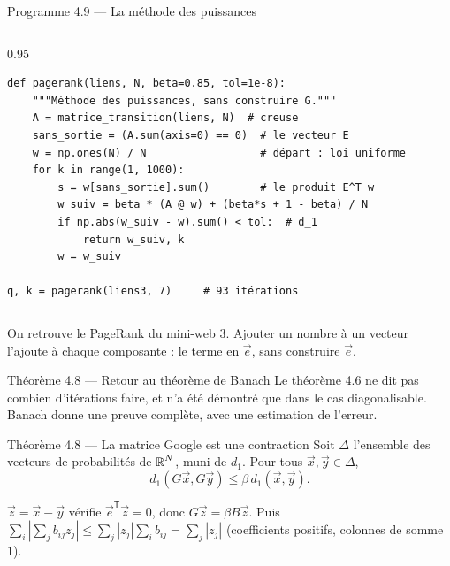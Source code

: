 \begin{frame}[fragile]{Programme 4.9 --- La méthode des puissances}
  \begin{columns}[T]
    \begin{column}{0.95\textwidth}
\begin{lstlisting}
def pagerank(liens, N, beta=0.85, tol=1e-8):
    """Méthode des puissances, sans construire G."""
    A = matrice_transition(liens, N)  # creuse
    sans_sortie = (A.sum(axis=0) == 0)  # le vecteur E
    w = np.ones(N) / N                  # départ : loi uniforme
    for k in range(1, 1000):
        s = w[sans_sortie].sum()        # le produit E^T w
        w_suiv = beta * (A @ w) + (beta*s + 1 - beta) / N
        if np.abs(w_suiv - w).sum() < tol:  # d_1
            return w_suiv, k
        w = w_suiv

q, k = pagerank(liens3, 7)     # 93 itérations
\end{lstlisting}
    \end{column}
  \end{columns}
  \small On retrouve le PageRank du mini-web 3. Ajouter un nombre à un
  vecteur l'ajoute à chaque composante : le terme en $\vec e$, sans
  construire $\vec e$.
\end{frame}

\begin{frame}{Théorème 4.8 --- Retour au théorème de Banach}
  \small Le théorème 4.6 ne dit pas combien d'itérations faire, et n'a été
  démontré que dans le cas diagonalisable. Banach donne une preuve
  complète, avec une estimation de l'erreur.
  \begin{Enonce}{Théorème 4.8 --- La matrice Google est une contraction}
    Soit $\Delta$ l'ensemble des vecteurs de probabilités de $\operatorname{\mathbb{R}}^N$, muni
    de $d_1$. Pour tous $\vec x,\vec y\in\Delta$,
    \[
      d_1(G\vec x,G\vec y)\leq\beta\,d_1(\vec x,\vec y).
    \]
  \end{Enonce}
  \begin{AuTableau}
    \footnotesize $\vec z=\vec x-\vec y$ vérifie $\vec e^{\mathsf T}\vec z=0$,
    donc $G\vec z=\beta B\vec z$. Puis
    $\sum_i|\sum_j b_{ij}z_j|\leq\sum_j|z_j|\sum_i b_{ij}=\sum_j|z_j|$
    (coefficients positifs, colonnes de somme $1$).
  \end{AuTableau}
\end{frame}

